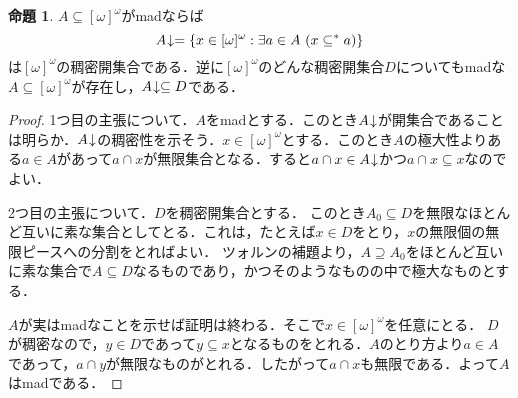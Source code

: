 \documentclass[uplatex,dvipdfmx]{jsarticle}
\newcommand{\down}{\hspace{-0.2em}\downarrow}
\renewcommand\subset{\subseteq}
\theoremstyle{definition}
\newtheorem{prop}[thm]{命題}
\theoremstyle{named}
\begin{document}
\begin{prop}\label{madprop}\cite[6.18 Proposition]{blass}
$A \subset [\omega]^\omega$がmadならば
\[
A\down = \{ x \in [\omega]^\omega : \exists a \in A\ (x \subset^* a) \}
\]
は$[\omega]^\omega$の稠密開集合である．逆に$[\omega]^\omega$のどんな稠密開集合$D$についてもmadな$A\subset[\omega]^\omega$が存在し，$A\down \subset D$である．
\end{prop}
\begin{proof}
1つ目の主張について．$A$をmadとする．このとき$A \down$が開集合であることは明らか．$A \down$の稠密性を示そう．$x \in [\omega]^\omega$とする．このとき$A$の極大性よりある$a \in A$があって$a \cap x$が無限集合となる．すると$a \cap x \in A\down$かつ$a \cap x \subset x$なのでよい．

2つ目の主張について．$D$を稠密開集合とする．
このとき$A_0 \subset D$を無限なほとんど互いに素な集合としてとる．これは，たとえば$x \in D$をとり，$x$の無限個の無限ピースへの分割をとればよい．
ツォルンの補題より，$A \supseteq A_0$をほとんど互いに素な集合で$A \subset D$なるものであり，かつそのようなものの中で極大なものとする．

$A$が実はmadなことを示せば証明は終わる．そこで$x \in [\omega]^\omega$を任意にとる．
$D$が稠密なので，$y \in D$であって$y \subseteq x$となるものをとれる．$A$のとり方より$a \in A$であって，$a \cap y$が無限なものがとれる．したがって$a \cap x$も無限である．よって$A$はmadである．
\end{proof}
\end{document}
